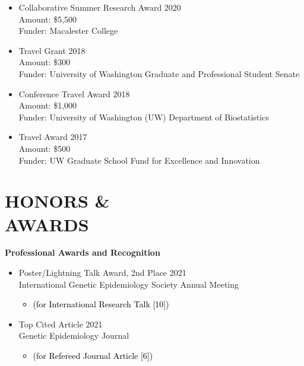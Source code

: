 \documentclass[margin]{res}
\newcommand{\annotateItem}[1]{
	\begin{itemize} \vspace{-0.1cm}
	\item[] 
	\begin{footnotesize}\textcolor{black}{(#1)}\end{footnotesize}
	\end{itemize} \vspace{-0.1cm}
}
\begin{document}
\begin{resume}
\begin{itemize}


\item[4.] Collaborative Summer Research Award  \hfill 2020 \\ %
Amount:  \$5,500 \\
Funder: Macalester College

\item[3.] Travel Grant  \hfill 2018 \\ 
Amount: \$300 \\
Funder: University of Washington Graduate and Professional Student Senate 

\item[2.] Conference Travel Award \hfill 2018 \\
Amount: \$1,000 \\
Funder: University of Washington (UW) Department of Biostatistics

\item[1.] Travel Award \hfill 2017 \\
Amount: \$500 \\
Funder: UW Graduate School Fund for Excellence and Innovation \\
\end{itemize}





\section{HONORS \& \\ AWARDS}

\textbf{Professional Awards and Recognition}
\begin{itemize}

\item Poster/Lightning Talk Award, 2nd Place   \hfill 2021 \\
International Genetic Epidemiology Society Annual Meeting
	\annotateItem{for International Research Talk [10]}

\item Top Cited Article  \hfill 2021 \\
Genetic Epidemiology Journal
	\annotateItem{for Refereed Journal Article [6]}


\end{itemize}
\end{resume}
\end{document}
